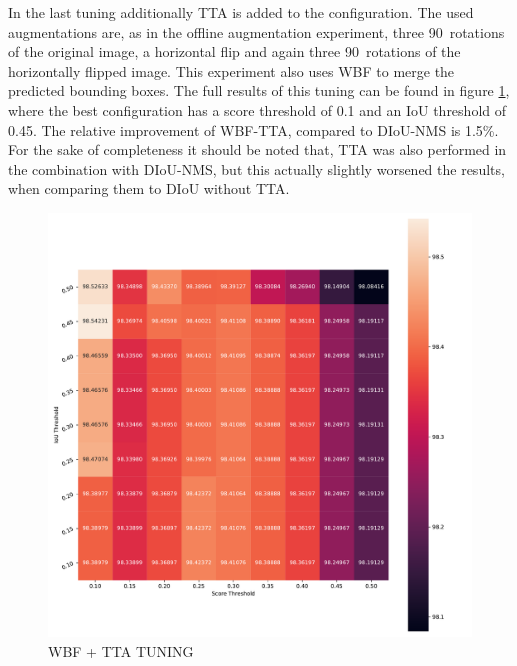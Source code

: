 In the last tuning additionally \ac{TTA} is added to the configuration.
The used augmentations are, as in the offline augmentation experiment, three 90\textdegree\ rotations of the original image, a horizontal flip and again three 90\textdegree\ rotations of the horizontally flipped image.
This experiment also uses \ac{WBF} to merge the predicted bounding boxes.
The full results of this tuning can be found in figure \ref{fig:wbf_tta_nms_tuning}, where the best configuration has a score threshold of 0.1 and an \ac{IoU} threshold of 0.45.
The relative improvement of \ac{WBF}-\ac{TTA}, compared to \ac{DIoU}-\ac{NMS} is 1.5\%.
For the sake of completeness it should be noted that, \ac{TTA} was also performed in the combination with \ac{DIoU}-\ac{NMS}, but this actually slightly worsened the results, when comparing them to \ac{DIoU} without \ac{TTA}.


\begin{figure}
\begin{center}
    \includegraphics[width=\columnwidth]{imgs/yolo_wbf_tta_heat.pdf}
    \caption{WBF + TTA TUNING}
    \label{fig:wbf_tta_nms_tuning}
\end{center}
\end{figure}


